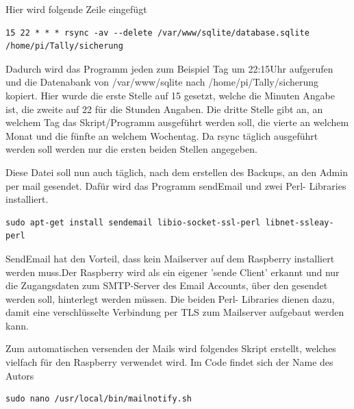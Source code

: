\documentclass[11pt,a4paper]{article} %
\begin{document}
Hier wird folgende Zeile eingefügt
\begin{frame}

\begin{lstlisting}
15 22 * * * rsync -av --delete /var/www/sqlite/database.sqlite  /home/pi/Tally/sicherung
\end{lstlisting}
\end{frame}
Dadurch wird das Programm jeden zum Beispiel Tag um 22:15Uhr aufgerufen und die Datenabank von /var/www/sqlite nach /home/pi/Tally/sicherung  kopiert. Hier wurde die erste Stelle auf 15 gesetzt, welche die Minuten Angabe ist, die zweite auf 22 für die Stunden Angaben. Die dritte Stelle gibt an, an welchem Tag das Skript/Programm ausgeführt werden soll, die vierte an welchem Monat und die fünfte an welchem Wochentag. Da rsync täglich ausgeführt werden soll werden nur die ersten beiden Stellen angegeben.
\par
Diese Datei soll nun auch täglich, nach dem erstellen des Backups, an den Admin per mail gesendet.
Dafür wird das Programm sendEmail und zwei Perl- Libraries installiert.
\begin{frame}

\begin{lstlisting}
sudo apt-get install sendemail libio-socket-ssl-perl libnet-ssleay-perl
\end{lstlisting}
\end{frame}
SendEmail hat den Vorteil, dass kein Mailserver auf dem Raspberry installiert werden muss.Der Raspberry wird als ein eigener 'sende Client' erkannt und nur die Zugangsdaten zum SMTP-Server des Email Accounts, über den gesendet werden soll, hinterlegt werden müssen. Die beiden Perl- Libraries dienen dazu, damit eine verschlüsselte Verbindung per TLS zum Mailserver aufgebaut werden kann.
\par
Zum automatischen versenden der Mails wird folgendes Skript erstellt, welches vielfach für den Raspberry verwendet wird. Im Code findet sich der Name des Autors \cite{10}
\begin{frame}

\begin{lstlisting}
sudo nano /usr/local/bin/mailnotify.sh
\end{lstlisting}
\end{frame}
\end{document}
